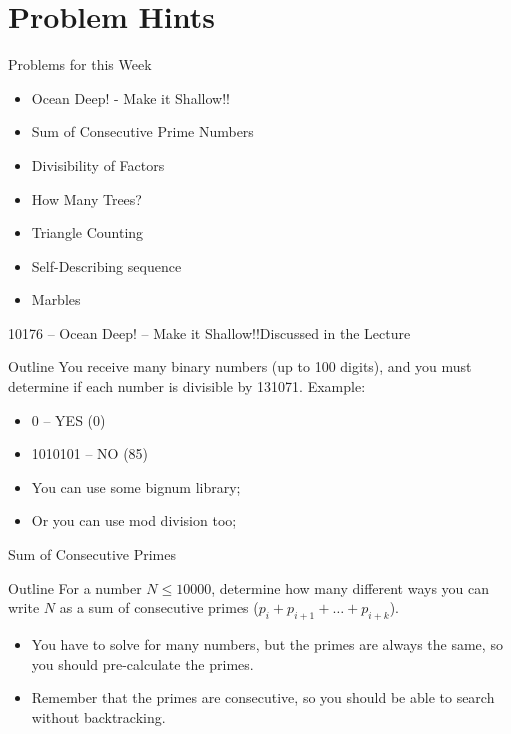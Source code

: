 \section{Problem Hints}

\begin{frame}{Problems for this Week}
  \begin{itemize}
    \item Ocean Deep! - Make it Shallow!!
    \item Sum of Consecutive Prime Numbers
    \item Divisibility of Factors
    \item How Many Trees?
    \item Triangle Counting
    \item Self-Describing sequence
    \item Marbles
  \end{itemize}
\end{frame}

\begin{frame}{10176 -- Ocean Deep! -- Make it Shallow!!}{Discussed in the Lecture}

  \begin{block}{Outline}
    You receive many binary numbers (up to 100 digits), and you must determine if each number is divisible by 131071. Example:
    \bigskip

    \begin{itemize}
      \item 0 -- YES (0)
      \item 1010101 -- NO (85)
    \end{itemize}
  \end{block}\bigskip

  \begin{itemize}
    \item You can use some bignum library;
    \item Or you can use mod division too;
  \end{itemize}
\end{frame}

\begin{frame}{Sum of Consecutive Primes}
  \begin{block}{Outline}
    For a number $N \leq 10000$, determine how many different ways you can write $N$ as a sum of consecutive primes ($p_i + p_{i+1} + \ldots + p_{i+k}$).
  \end{block}\bigskip

  \begin{itemize}
    \item You have to solve for many numbers, but the primes are always the same, so you should pre-calculate the primes.
    \item Remember that the primes are consecutive, so you should be able to search without backtracking.
  \end{itemize}
\end{frame}


